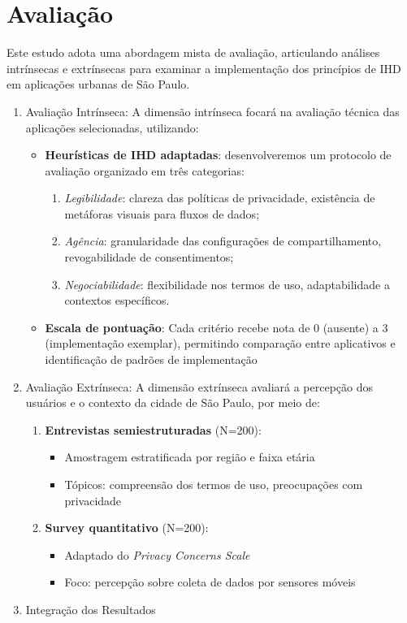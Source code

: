 \documentclass[
	12pt,				%
	oneside,			%
	a4paper,			%
	english,			%
	brazil				%
	]{abntex2ppgsi}
\begin{document}
  \section{Avaliação}
Este estudo adota uma abordagem mista de avaliação, articulando análises intrínsecas e extrínsecas para examinar a implementação dos princípios de IHD em aplicações urbanas de São Paulo.
     \begin{enumerate}
   \item {Avaliação Intrínseca}: A dimensão intrínseca focará na avaliação técnica das aplicações selecionadas, utilizando:

    \begin{itemize}
        \item \textbf{Heurísticas de IHD adaptadas}: desenvolveremos um protocolo de avaliação organizado em três categorias:
        \begin{enumerate}
            \item \textit{Legibilidade}: clareza das políticas de privacidade, existência de metáforas visuais para fluxos de dados;
            \item \textit{Agência}: granularidade das configurações de compartilhamento, revogabilidade de consentimentos;
            \item \textit{Negociabilidade}: flexibilidade nos termos de uso, adaptabilidade a contextos específicos.
        \end{enumerate}
        \item \textbf{Escala de pontuação}: Cada critério recebe nota de 0 (ausente) a 3 (implementação exemplar), permitindo comparação entre aplicativos e identificação de padrões de implementação
    \end{itemize}

     \item{Avaliação Extrínseca}: A dimensão extrínseca avaliará a percepção dos usuários e o contexto da cidade de São Paulo, por meio de:
     \begin{enumerate}
    \item \textbf{Entrevistas semiestruturadas} (N=200):
    \begin{itemize}
        \item Amostragem estratificada por região e faixa etária
        \item Tópicos: compreensão dos termos de uso, preocupações com privacidade
    \end{itemize}    
    \item \textbf{Survey quantitativo} (N=200):
    \begin{itemize}
        \item Adaptado do \textit{Privacy Concerns Scale} \cite{masur2018situational}
        \item Foco: percepção sobre coleta de dados por sensores móveis
    \end{itemize}
         \end{enumerate}

    \item{Integração dos Resultados}
      \end{enumerate}
\end{document}
